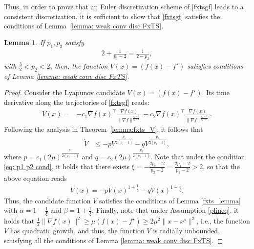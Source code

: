 \documentclass[letterpaper]{article}
\newtheorem{lemma}{Lemma} %
\begin{document}
Thus, in order to prove that an Euler discretization scheme of \eqref{fxtsgf} leads to a consistent discretization, it is sufficient to show that \eqref{fxtsgf} satisfies the conditions of Lemma~\ref{lemma: weak conv disc FxTS}.

\begin{lemma}\label{lemma:V p1 p2}
If $p_1, p_2$ satisfy
\begin{align}\label{eq: p1 p2 cond}
 2 + \frac{1}{p_1-2}  = \frac{1}{2-p_2},
\end{align}
with $\frac{3}{2}<p_2<2$, then, the function $V(x) = (f(x)-f^\star)$ satisfies conditions of Lemma \ref{lemma: weak conv disc FxTS}.
\end{lemma}
\begin{proof}
Consider the Lyapunov candidate $V(x) = (f(x)-f^\star)$. Its time derivative along the trajectories of \eqref{fxtsgf} reads:
\begin{align*}
    \dot V(x) =& -c_1\nabla f(x)^\intercal \frac{\nabla f(x)}{\|\nabla f\|^{\frac{p_2-2}{p_2-1}}}-c_2\nabla f(x)^\intercal \frac{\nabla f(x)}{\|\nabla f\|^{\frac{p_1-2}{p_1-1}}}.
\end{align*}
Following the analysis in Theorem~\ref{lemma:fxts_V}, it follows that
\begin{align*}
\dot{V} &\leq -pV^{\frac{p_1}{2(p_1-1)}} -q V^{\frac{p_2}{2(p_2-1)}},
\end{align*}
where $p= c_1 (2\mu)^{\frac{p_1}{2(p_1-1)}}$ and $q=c_2 (2\mu)^{\frac{p_2}{2(p_2-1)}}$. Note that under the condition \eqref{eq: p1 p2 cond}, it holds that there exists $\xi = -\frac{2p_2-2}{p_2-2} = \frac{2p_1-2}{p_1-2}>2$, so that the above equation reads
\begin{align*}
    \dot V(x) = -pV(x)^{1+\frac{1}{\xi}}
    -qV(x)^{1-\frac{1}{\xi}}.
\end{align*}
Thus, the candidate function $V$ satisfies the conditions of Lemma \ref{fxts_lemma} with $\alpha = 1-\frac{1}{\xi}$ and $\beta = 1+\frac{1}{\xi}$. Finally, note that under Assumption \ref{plineq}, it holds that $\frac{1}{2}\|\nabla f(x)\|^2\geq \mu (f(x)-f^\star)\geq 2\mu^2\|x-x^\star\|^2$, i.e., the function $V$ has quadratic growth, and thus, the function $V$ is radially unbounded, satisfying all the conditions of Lemma \ref{lemma: weak conv disc FxTS}. 
\end{proof}
\end{document}
